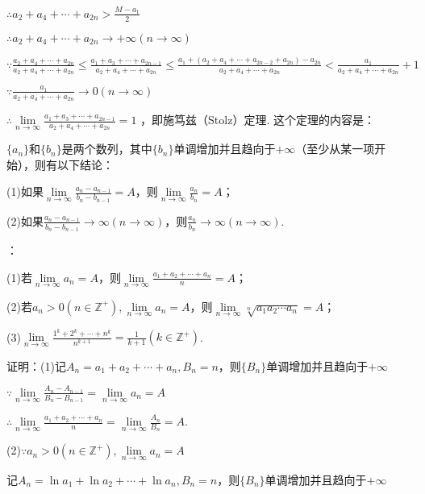 \documentclass[12pt,UTF8]{ctexart}
\begin{document}
\begin{enumerate}
$\therefore a_2+a_4+\cdots+a_{2n}>\frac{M-a_1}{2}$

$\therefore a_2+a_4+\cdots+a_{2n}\rightarrow+\infty(n\rightarrow\infty)$

$\because \frac{a_2+a_4+\cdots+a_{2n}}{a_2+a_4+\cdots+a_{2n}}\leq\frac{a_1+a_3+\cdots+a_{2n-1}}{a_2+a_4+\cdots+a_{2n}}\leq\frac{a_1+(a_2+a_4+\cdots+a_{2n-2}+a_{2n})-a_{2n}}{a_2+a_4+\cdots+a_{2n}}<\frac{a_1}{a_2+a_4+\cdots+a_{2n}}+1$

$\because\frac{a_1}{a_2+a_4+\cdots+a_{2n}}\rightarrow0(n\rightarrow\infty)$

$\therefore\lim\limits_{n\rightarrow\infty}\frac{a_1+a_3+\cdots+a_{2n-1}}{a_2+a_4+\cdots+a_{2n}}=1$
，即施笃兹（Stolz）定理. 这个定理的内容是：

$\{a_n\}$和$\{b_n\}$是两个数列，其中$\{b_n\}$单调增加并且趋向于$+\infty$（至少从某一项开始），则有以下结论：

\indent(1)如果$\lim\limits_{n\rightarrow\infty}\frac{a_n-a_{n-1}}{b_n-b_{n-1}}=A$，则$\lim\limits_{n\rightarrow\infty}\frac{a_n}{b_n}=A$；

\indent(2)如果$\frac{a_n-a_{n-1}}{b_n-b_{n-1}}\rightarrow\infty(n\rightarrow\infty)$，则$\frac{a_n}{b_n}\rightarrow\infty(n\rightarrow\infty)$.

：

\indent(1)若$\lim\limits_{n\rightarrow\infty}a_n=A$，则$\lim\limits_{n\rightarrow\infty}\frac{a_1+a_2+\cdots+a_n}n=A$；

\indent(2)若$a_n>0(n\in\mathbb Z^+),\lim\limits_{n\rightarrow\infty}a_n=A$，则$\lim\limits_{n\rightarrow\infty}\sqrt[n]{a_1a_2\cdots a_n}=A$；

\indent(3)$\lim\limits_{n\rightarrow\infty}\frac{1^k+2^k+\cdots+n^k}{n^{k+1}}=\frac1{k+1}(k\in\mathbb Z^+)$.

证明：(1)记$A_n=a_1+a_2+\cdots+a_n,B_n=n$，则$\{B_n\}$单调增加并且趋向于$+\infty$

$\because\lim\limits_{n\rightarrow\infty}\frac{A_n-A_{n-1}}{B_n-B_{n-1}}=\lim\limits_{n\rightarrow\infty}a_n=A$


$\therefore\lim\limits_{n\rightarrow\infty}\frac{a_1+a_2+\cdots+a_n}n=\lim\limits_{n\rightarrow\infty}\frac{A_n}{B_n}=A$.

(2)$\because a_n>0(n\in\mathbb Z^+),\lim\limits_{n\rightarrow\infty}a_n=A$


记$A_n=\ln a_1+\ln a_2+\cdots+\ln a_n,B_n=n$，则$\{B_n\}$单调增加并且趋向于$+\infty$


\end{enumerate}
\end{document}

